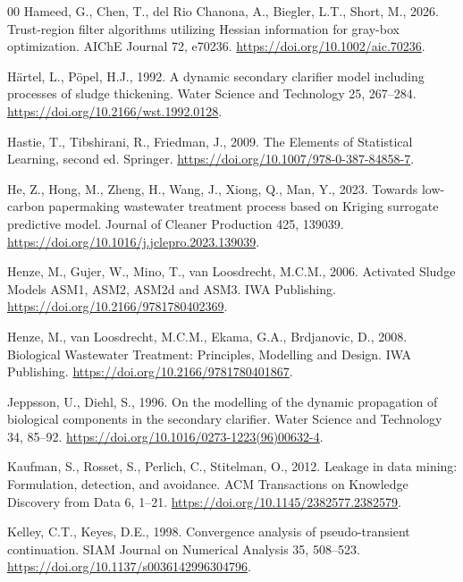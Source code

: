 \documentclass[a4paper,fleqn]{cas-sc}
\begin{document}
\begin{thebibliography}{00}
Hameed, G., Chen, T., del Rio Chanona, A., Biegler, L.T., Short, M., 2026. Trust-region filter algorithms utilizing Hessian information for gray-box optimization. AIChE Journal 72, e70236. \url{https://doi.org/10.1002/aic.70236}.

H\"artel, L., P\"opel, H.J., 1992. A dynamic secondary clarifier model including processes of sludge thickening. Water Science and Technology 25, 267--284. \url{https://doi.org/10.2166/wst.1992.0128}.

Hastie, T., Tibshirani, R., Friedman, J., 2009. The Elements of Statistical Learning, second ed. Springer. \url{https://doi.org/10.1007/978-0-387-84858-7}.

He, Z., Hong, M., Zheng, H., Wang, J., Xiong, Q., Man, Y., 2023. Towards low-carbon papermaking wastewater treatment process based on Kriging surrogate predictive model. Journal of Cleaner Production 425, 139039. \url{https://doi.org/10.1016/j.jclepro.2023.139039}.

Henze, M., Gujer, W., Mino, T., van Loosdrecht, M.C.M., 2006. Activated Sludge Models ASM1, ASM2, ASM2d and ASM3. IWA Publishing. \url{https://doi.org/10.2166/9781780402369}.

Henze, M., van Loosdrecht, M.C.M., Ekama, G.A., Brdjanovic, D., 2008. Biological Wastewater Treatment: Principles, Modelling and Design. IWA Publishing. \url{https://doi.org/10.2166/9781780401867}.

Jeppsson, U., Diehl, S., 1996. On the modelling of the dynamic propagation of biological components in the secondary clarifier. Water Science and Technology 34, 85--92. \url{https://doi.org/10.1016/0273-1223(96)00632-4}.

Kaufman, S., Rosset, S., Perlich, C., Stitelman, O., 2012. Leakage in data mining: Formulation, detection, and avoidance. ACM Transactions on Knowledge Discovery from Data 6, 1--21. \url{https://doi.org/10.1145/2382577.2382579}.

Kelley, C.T., Keyes, D.E., 1998. Convergence analysis of pseudo-transient continuation. SIAM Journal on Numerical Analysis 35, 508--523. \url{https://doi.org/10.1137/s0036142996304796}.


\end{thebibliography}
\end{document}
